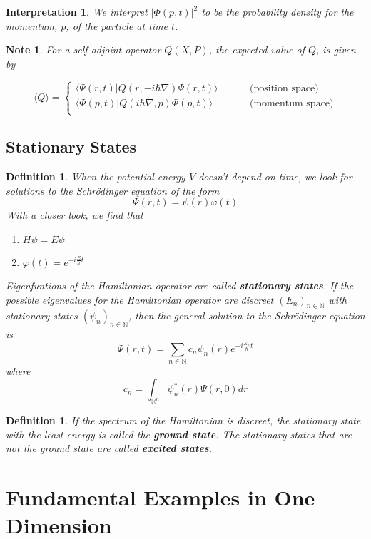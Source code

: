 \documentclass[12pt]{amsart}
\newtheorem{defn}[thm]{Definition}
\newtheorem{intp}[thm]{Interpretation}
\newtheorem{note}[thm]{Note}
\renewcommand{\r}{\rangle}
\renewcommand{\l}{\langle}
\newcommand{\sch}{Schr\"{o}dinger }
\newcommand{\N}{\mathbb{N}}
\newcommand{\R}{\mathbb{R}}
\begin{document}
\begin{intp}
We interpret $\vert \Phi (p,t) \vert^2$ to be the probability density for the momentum, $p$, of the particle at time $t$.  
\end{intp}

\begin{note}
For a self-adjoint operator $Q(X,P)$, the expected value of $Q$,  is given by 

\[ 
\l Q \r = 
\begin{cases}
\l \Psi(r,t) \vert Q(r, -i\hbar \nabla) \Psi(r,t)\r & \hspace{1cm} \text{(position space)}\\
\l \Phi(p,t) \vert Q(i\hbar \nabla, p) \Phi(p,t) \r & \hspace{1cm} \text{(momentum space)}\\
\end{cases}
\]
\end{note}

\subsection{Stationary States}
\begin{defn}
When the potential energy $V$ doesn't depend on time, we look for solutions to the \sch equation of the form $$\Psi(r,t) = \psi(r) \varphi(t)$$ With a closer look, we find that

\begin{enumerate}
\item $H\psi = E \psi$
\item $\varphi(t) = e^{-i\frac{E}{\hbar}t}$
\end{enumerate}
Eigenfuntions of the Hamiltonian operator are called \textbf{stationary states}. If the possible eigenvalues for the Hamiltonian operator are discreet $(E_n)_{n\in \N}$ with stationary states $(\psi_n)_{n \in \N}$, then the general solution to the \sch equation is $$\Psi(r,t) = \sum_{n \in \N} c_n \psi_n(r) e^{-i\frac{E_n}{\hbar}t}$$ where $$c_n = \int_{\R^n}\psi_n^*(r) \Psi(r,0)dr$$
\end{defn}

\begin{defn}
If the spectrum of the Hamiltonian is discreet, the stationary state with the least energy is called the \textbf{ground state}. The stationary states that are not the ground state are called \textbf{excited states}.
\end{defn}

\section{Fundamental Examples in One Dimension}
\end{document}
